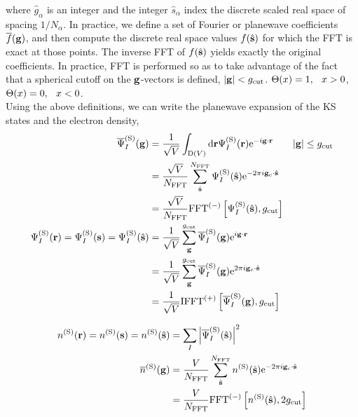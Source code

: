 \documentclass[paper=a4, fontsize=11pt]{article} %
\numberwithin{equation}{section} %
\numberwithin{figure}{section} %
\numberwithin{table}{section} %
\newcommand{\ol}{\overline}
\newcommand{\bs}{{\bf{s}}}
\newcommand{\bg}{{\bf{g}}}
\newcommand{\br}{{\bf{r}}}
\newcommand{\hs}{{\hat{\bf{s}}}}
\newcommand{\rS}{{\mathrm{S}}}
\newcommand{\rcut}{{\mathrm{cut}}}
\newcommand{\re}{{\mathrm{e}}}
\newcommand{\rd}{{\mathrm{d}}}
\newcommand{\rD}{{\mathrm{D}}}
\newcommand{\ibgr}{i\bg\cdot\br}
\newcommand{\gc}{{\bg_c}}
\newcommand{\igcs}{2\pi i\gc\cdot\hat \bs}
\newcommand{\al}{{\alpha}}
\newcommand{\psigs}{{\overline \Psi_I^{(\rS)}(\bg)}}
\newcommand{\NFFT}{{N_{\mathrm{FFT}}}}
\begin{document}
where $\hat g_\alpha$ is an integer and the integer $\hat s_\al$ index the discrete scaled real space of spacing $1/N_\alpha$. In practice, we define a set of Fourier or planewave coefficients $\ol f(\bg)$, and then compute the discrete real space values $f(\hs)$ for which the FFT is exact at those points. The inverse FFT of $f(\hs)$ yields exactly the original coefficients. In practice, FFT is performed so as to take advantage of the fact that a spherical cutoff on the $\bg$-vectors is defined, $|\bg| < g_\rcut$. $\Theta(x)=1,\hspace*{0.1in} x>0$,\hspace*{0.2in} $\Theta(x)=0,\hspace*{0.1in}  x<0 $.
\\

Using the above definitions, we can write the planewave expansion of the KS states and the electron density, 
\begin{equation}\nonumber
\begin{split}
\psigs
&= \frac{1}{\sqrt V} \int _{\rD(V)} \rd \br \Psi_I^{(\rS)}(\br) \re^{-\ibgr}  \ \ \ \ \ \ |\bg| \leq g_\rcut \\
&= \frac{\sqrt{V}} {N_{\mathrm{FFT}}} \sum_{\hs}^\NFFT \Psi_I^{(\rS)}(\hs)\re^{-\igcs} \\
&=\frac{\sqrt{V}} {N_{\mathrm{FFT}}} \mathrm{FFT}^{(-)}\left[\Psi_I^{(\rS)}(\hs), g_\rcut\right]\\
%
\Psi_I^{(\rS)}(\br)=\Psi_I^{(\rS)}(\bs)=\Psi_I^{(\rS)}(\hs) &=\frac{1}{\sqrt{V}}\sum_\bg^{g_\rcut} \overline{\Psi}^{(\rS)}_I(\bg)  \re^{\ibgr} \\
&=\frac{1}{\sqrt{V}}\sum_\bg^{g_\rcut} \overline{\Psi}^{(\rS)}_I(\bg)  \re^{\igcs} \\
&= \frac{1}{\sqrt{V}}\mathrm{IFFT}^{(+)} \left[\overline{\Psi}^{(\rS)}_I(\bg),g_\rcut\right]\\
\end{split}
\end{equation}

\begin{equation}
\begin{split}
%
n^{(\rS)}(\br)=n^{(\rS)}(\bs)=n^{(\rS)}(\hat \bs)
&= \sum_I \left| \overline \Psi_I^{(\rS)}(\hat \bs) \right|^2 \\
\overline{n}^{(\rS)}(\bg) 
&=\frac{V}{\NFFT}\sum_{\hat \bs}^{\NFFT} n^{(\rS)}(\hat \bs) \re^{-\igcs} \\
&= \frac{V}{\NFFT}\mathrm{FFT}^{(-)}\left[n^{(\rS)}(\hat \bs),2g_\rcut\right]
\end{split}
\end{equation}
\end{document}
